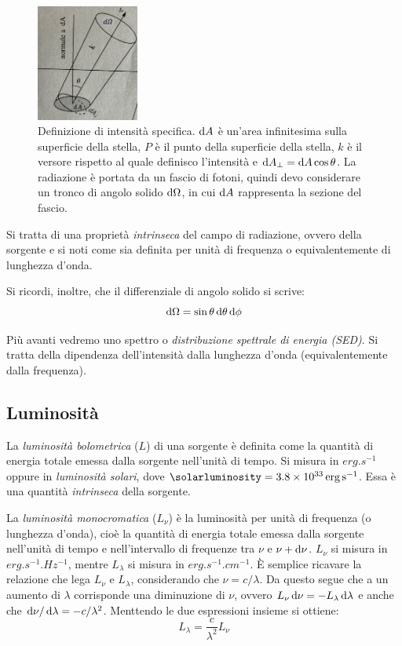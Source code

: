 \begin{figure}
\centering
\includegraphics[width=0.3\textwidth]{immagini/intensita-specifica.png}
\caption{Definizione di intensità specifica. $\mathop{}\!\mathrm{d} A$ è un'area infinitesima sulla superficie della stella, $P$ è il punto della superficie della stella, $k$ è il versore rispetto al quale definisco l'intensità e $\mathop{}\!\mathrm{d} A_\perp = \mathop{}\!\mathrm{d} A \cos{\theta}$. La radiazione è portata da un fascio di fotoni, quindi devo considerare un tronco di angolo solido $\mathop{}\!\mathrm{d} \Omega$, in cui $\mathop{}\!\mathrm{d} A$ rappresenta la sezione del fascio.}
\label{fig:intensità-specifica}
\end{figure}

Si tratta di una proprietà \emph{intrinseca} del campo di radiazione, ovvero della sorgente e si noti come sia definita per unità di frequenza o equivalentemente di lunghezza d'onda.

Si ricordi, inoltre, che il differenziale di angolo solido si scrive:
\begin{equation}\label{eq:angolo-solido}
    \mathop{}\!\mathrm{d} \Omega = \sin{\theta} \mathop{}\!\mathrm{d} \theta \mathop{}\!\mathrm{d} \phi
\end{equation}

Più avanti vedremo uno spettro o \emph{distribuzione spettrale di energia (SED)}. Si tratta della dipendenza dell'intensità dalla lunghezza d'onda (equivalentemente dalla frequenza). 

\subsection{Luminosità}\label{sec:luminosità}
La \emph{luminosità bolometrica} ($L$) di una sorgente è definita come la quantità di energia totale emessa dalla sorgente nell'unità di tempo. Si misura in $\si{erg.s^{-1}}$ oppure in \emph{luminosità solari}, dove $\si{\solarluminosity} = \SI{3.8e33}{erg.s^{-1}}$. Essa è una quantità \emph{intrinseca} della sorgente.

La \emph{luminosità monocromatica} ($L_\nu$) è la luminosità per unità di frequenza (o lunghezza d'onda), cioè la quantità di energia totale emessa dalla sorgente nell'unità di tempo e nell'intervallo di frequenze tra $\nu$ e $\nu + \mathop{}\!\mathrm{d} \nu$. $L_\nu$ si misura in $\si{erg.s^{-1}.Hz^{-1}}$, mentre $L_\lambda$ si misura in $\si{erg.s^{-1}.cm^{-1}}$. È semplice ricavare la relazione che lega $L_\nu$ e $L_\lambda$, considerando che $\nu = c / \lambda$. Da questo segue che a un aumento di $\lambda$ corrisponde una diminuzione di $\nu$, ovvero $L_\nu \mathop{}\!\mathrm{d} \nu = - L_\lambda \mathop{}\!\mathrm{d} \lambda$ e anche che $\mathop{}\!\mathrm{d} \nu / \mathop{}\!\mathrm{d} \lambda = - c / \lambda^2$. Menttendo le due espressioni insieme si ottiene:
\begin{equation}\label{eq:luminosità-monocromatica}
    L_\lambda = \frac{c}{\lambda^2} L_\nu
\end{equation}

